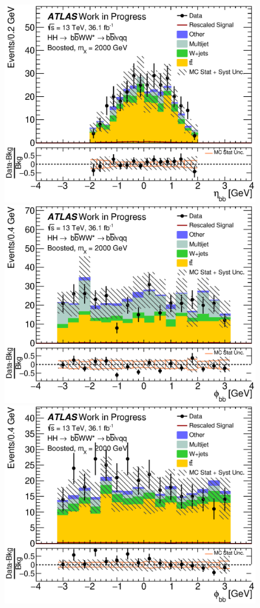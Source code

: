 \begin{figure}[h]
\begin{center}
\includegraphics[scale=0.33]{figures/kinplots/C_2tag_mbbcr_muon_presel_met50_HbbEta}\\
\includegraphics[scale=0.33]{figures/kinplots/C_2tag_mbbcr_elec_presel_met50_HbbPhi}
\includegraphics[scale=0.33]{figures/kinplots/C_2tag_mbbcr_muon_presel_met50_HbbPhi}

\end{center}
\end{figure}
